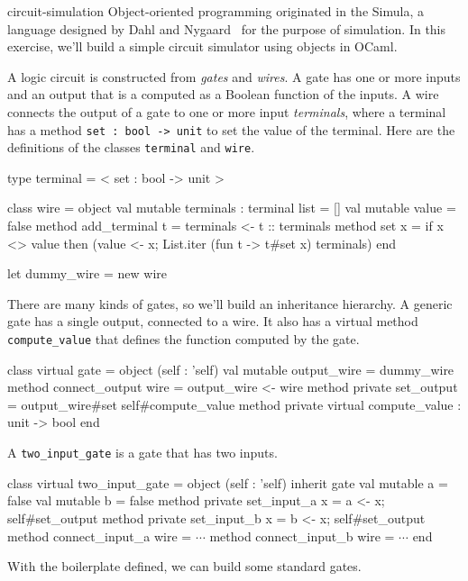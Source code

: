 %
\begin{exercise}{circuit-simulation}
Object-oriented programming originated in the Simula, a language designed by Dahl
and Nygaard~\cite{ND81} for the purpose of simulation.  In this exercise, we'll build a simple circuit simulator
using objects in OCaml.

A logic circuit is constructed from \emph{gates} and \emph{wires}.  A gate has one or more inputs and an
output that is a computed as a Boolean function of the inputs.  A wire connects the output of a gate
to one or more input \emph{terminals}, where a terminal has a method \hbox{\lstinline/set : bool -> unit/} to
set the value of the terminal.  Here are the definitions of the classes \hbox{\lstinline/terminal/} and \hbox{\lstinline/wire/}.

\begin{ocaml}
type terminal = < set : bool -> unit >

class wire =
object
   val mutable terminals : terminal list = []
   val mutable value = false
   method add_terminal t = terminals <- t :: terminals
   method set x =
      if x <> value then (value <- x; List.iter (fun t -> t#set x) terminals)
end

let dummy_wire = new wire
\end{ocaml}
%
There are many kinds of gates, so we'll build an inheritance hierarchy.
A generic gate has a single output, connected to a wire.  It also has
a virtual method \hbox{\lstinline/compute_value/} that defines the function
computed by the gate.

\begin{ocaml}
class virtual gate =
object (self : 'self)
   val mutable output_wire = dummy_wire
   method connect_output wire = output_wire <- wire
   method private set_output =  output_wire#set self#compute_value
   method private virtual compute_value : unit -> bool
end
\end{ocaml}
%
A \hbox{\lstinline/two_input_gate/} is a gate that has two inputs.

\begin{ocaml}
class virtual two_input_gate =
object (self : 'self)
   inherit gate
   val mutable a = false
   val mutable b = false
   method private set_input_a x = a <- x; self#set_output
   method private set_input_b x = b <- x; self#set_output
   method connect_input_a wire = $\cdots$
   method connect_input_b wire = $\cdots$
end
\end{ocaml}
%
With the boilerplate defined, we can build some standard gates.


\end{exercise}
